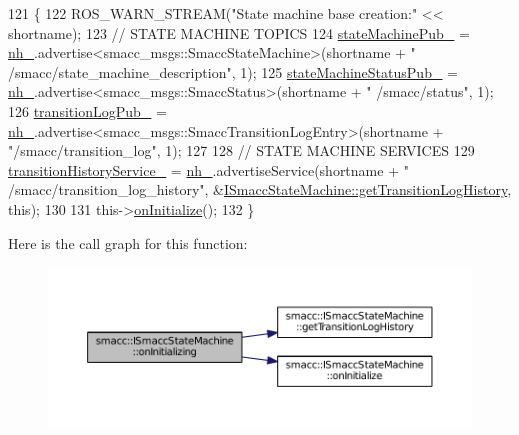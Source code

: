 \begin{DoxyCode}
121 \{
122     ROS\_WARN\_STREAM(\textcolor{stringliteral}{"State machine base creation:"} << shortname);
123     \textcolor{comment}{// STATE MACHINE TOPICS}
124     \hyperlink{classsmacc_1_1ISmaccStateMachine_af4aa9fed70bd4c57b19e3370fbd25de7}{stateMachinePub\_} = \hyperlink{classsmacc_1_1ISmaccStateMachine_ad8877bcca9dbb345fe72cca839c93dd3}{nh\_}.advertise<smacc\_msgs::SmaccStateMachine>(shortname + \textcolor{stringliteral}{"
      /smacc/state\_machine\_description"}, 1);
125     \hyperlink{classsmacc_1_1ISmaccStateMachine_a55a7c7b26ad4dfea441c62c6326a5414}{stateMachineStatusPub\_} = \hyperlink{classsmacc_1_1ISmaccStateMachine_ad8877bcca9dbb345fe72cca839c93dd3}{nh\_}.advertise<smacc\_msgs::SmaccStatus>(shortname + \textcolor{stringliteral}{"
      /smacc/status"}, 1);
126     \hyperlink{classsmacc_1_1ISmaccStateMachine_acc42eb050325c1edc77d81675fb1286a}{transitionLogPub\_} = \hyperlink{classsmacc_1_1ISmaccStateMachine_ad8877bcca9dbb345fe72cca839c93dd3}{nh\_}.advertise<smacc\_msgs::SmaccTransitionLogEntry>(shortname + \textcolor{stringliteral}{
      "/smacc/transition\_log"}, 1);
127 
128     \textcolor{comment}{// STATE MACHINE SERVICES}
129     \hyperlink{classsmacc_1_1ISmaccStateMachine_a73e2a7ca89c3d807eafe5cfb1e86ea05}{transitionHistoryService\_} = \hyperlink{classsmacc_1_1ISmaccStateMachine_ad8877bcca9dbb345fe72cca839c93dd3}{nh\_}.advertiseService(shortname + \textcolor{stringliteral}{"
      /smacc/transition\_log\_history"}, &\hyperlink{classsmacc_1_1ISmaccStateMachine_ae7c08fc2addf8ee4785f721050e6a763}{ISmaccStateMachine::getTransitionLogHistory}, \textcolor{keyword}{
      this});
130 
131     this->\hyperlink{classsmacc_1_1ISmaccStateMachine_ac2982c6c8283663e5e1e8a7c82f511ec}{onInitialize}();
132 \}
\end{DoxyCode}


Here is the call graph for this function\+:
\nopagebreak
\begin{figure}[H]
\begin{center}
\leavevmode
\includegraphics[width=350pt]{classsmacc_1_1ISmaccStateMachine_ae8c9c79ca6cd77c975f5d9cda33a6d5e_cgraph}
\end{center}
\end{figure}




